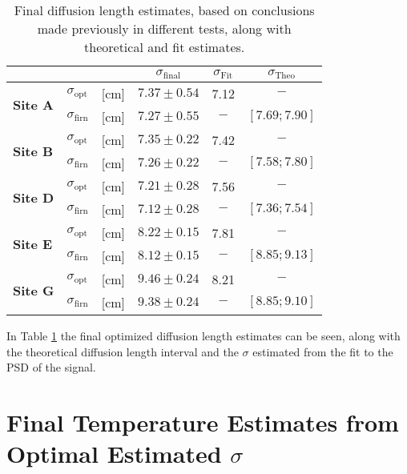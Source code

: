 \documentclass[../../CompleteThesis2/Complete_2ndDraft]{subfiles}
\begin{document}
\begin{table}[ht]
	\centering
	\begin{tabular}{l l l | c | c | c}
		& & & $\sigma_{\text{final}}$ & $\sigma_{\text{Fit}}$ & $\sigma_{\text{Theo}}$\\[0.15cm]
		\hline
		\hline 
		\multirow{2}{*}{\textbf{Site A}} & $\sigma_{\text{opt}}$ & [cm] & $7.37 \pm 0.54$ & 7.12 & $-$ \\[0.1cm]
		& $\sigma_{\text{firn}}$ & [cm] & $7.27\pm 0.55$ & $-$ & $\left[7.69;7.90\right]$\\[0.1cm]
		\hline
		
		\multirow{2}{*}{\textbf{Site B}} & $\sigma_{\text{opt}}$ & [cm] & $7.35 \pm 0.22$ & 7.42 & $-$ \\[0.1cm]
		& $\sigma_{\text{firn}}$ & [cm] & $7.26\pm 0.22$ & $-$ & $\left[7.58;7.80\right]$ \\[0.1cm]
		\hline
		
		\multirow{2}{*}{\textbf{Site D}} & $\sigma_{\text{opt}}$ & [cm] & $7.21 \pm 0.28$ & 7.56 & $-$ \\[0.1cm]
		& $\sigma_{\text{firn}}$ & [cm] & $7.12 \pm 0.28$ & $-$ & $\left[7.36;7.54\right]$ \\[0.1cm]
		\hline
		
		\multirow{2}{*}{\textbf{Site E}} & $\sigma_{\text{opt}}$ & [cm] & $ 8.22\pm 0.15$ & 7.81 & $-$ \\[0.1cm]
		& $\sigma_{\text{firn}}$ & [cm] & $8.12 \pm 0.15$ & $-$ & $\left[8.85;9.13\right]$ \\[0.1cm]
		\hline
		
		\multirow{2}{*}{\textbf{Site G}} & $\sigma_{\text{opt}}$ & [cm] & $9.46 \pm 0.24$ & 8.21 & $-$ \\[0.1cm]
		& $\sigma_{\text{firn}}$ & [cm] & $9.38 \pm 0.24$ & $-$ & $\left[8.85;9.10\right]$ \\[0.1cm]
		
		\hline
	\end{tabular}
\caption[Final $\sigma$ Estimates]{\small Final diffusion length estimates, based on conclusions made previously in different tests, along with theoretical and fit estimates.}
\label{Tab:SigmaEstFinal}
\end{table}

In Table \ref{Tab:SigmaEstFinal} the final optimized diffusion length estimates can be seen, along with the theoretical diffusion length interval and the $\sigma$ estimated from the fit to the PSD of the signal.


\section[Temperature Estimates from Data]{Final Temperature Estimates from Optimal Estimated $\sigma$}
\label{Sec:Results_TempEstData}
\end{document}
